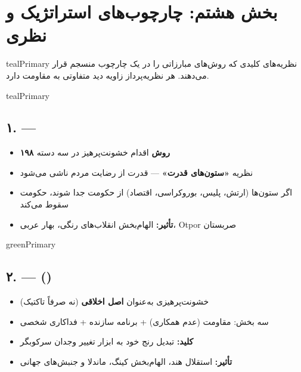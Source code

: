 \documentclass[a4paper,12pt]{article}
\begin{document}

\section{\textcolor{tealPrimary}{\faBrain} بخش هشتم: چارچوب‌های استراتژیک و نظری}

\begin{sectionbox}{tealPrimary}
نظریه‌های کلیدی که روش‌های مبارزاتی را در یک چارچوب منسجم قرار می‌دهند. هر نظریه‌پرداز زاویه دید متفاوتی به مقاومت دارد.
\end{sectionbox}

\begin{theorycard}{tealPrimary}
\subsection*{\textcolor{tealPrimary}{\faBook} ۱.  — }

\begin{itemize}[label=\textcolor{tealPrimary}{$\bullet$}]
  \item \textbf{۱۹۸ روش} اقدام خشونت‌پرهیز در سه دسته
  \item نظریه \textbf{«ستون‌های قدرت»} — قدرت از رضایت مردم ناشی می‌شود
  \item اگر ستون‌ها (ارتش، پلیس، بوروکراسی، اقتصاد) از حکومت جدا شوند، حکومت سقوط می‌کند
  \item \textbf{تأثیر:} الهام‌بخش انقلاب‌های رنگی، بهار عربی، Otpor صربستان
\end{itemize}
\end{theorycard}

\begin{theorycard}{greenPrimary}
\subsection*{\textcolor{greenPrimary}{\faBook} ۲.  —  ()}

\begin{itemize}[label=\textcolor{greenPrimary}{$\bullet$}]
  \item خشونت‌پرهیزی به‌عنوان \textbf{اصل اخلاقی} (نه صرفاً تاکتیک)
  \item سه بخش: مقاومت (عدم همکاری) + برنامه سازنده + فداکاری شخصی
  \item \textbf{کلید:} تبدیل رنج خود به ابزار تغییر وجدان سرکوبگر
  \item \textbf{تأثیر:} استقلال هند، الهام‌بخش کینگ، ماندلا و جنبش‌های جهانی
\end{itemize}
\end{theorycard}
\end{document}
